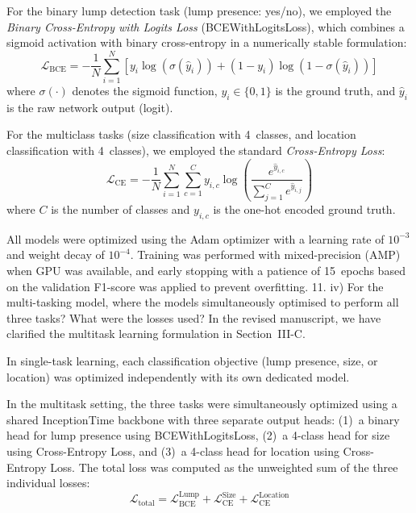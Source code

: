 \documentclass[a4paper, onecolumn]{IEEEtran}
\newcommand\blue[1]{{\textcolor{white!30!blue}{#1}}}
\begin{document}
For the binary lump detection task (lump presence: yes/no), we employed the \textit{Binary Cross-Entropy with Logits Loss} (BCEWithLogitsLoss), which combines a sigmoid activation with binary cross-entropy in a numerically stable formulation:
\begin{equation}
    \mathcal{L}_{\text{BCE}} = -\frac{1}{N}\sum_{i=1}^{N}\left[y_i \log(\sigma(\hat{y}_i)) + (1-y_i)\log(1-\sigma(\hat{y}_i))\right]
\end{equation}
where $\sigma(\cdot)$ denotes the sigmoid function, $y_i \in \{0,1\}$ is the ground truth, and $\hat{y}_i$ is the raw network output (logit).

For the multiclass tasks (size classification with 4~classes, and location classification with 4~classes), we employed the standard \textit{Cross-Entropy Loss}:
\begin{equation}
    \mathcal{L}_{\text{CE}} = -\frac{1}{N}\sum_{i=1}^{N}\sum_{c=1}^{C} y_{i,c} \log\left(\frac{e^{\hat{y}_{i,c}}}{\sum_{j=1}^{C}e^{\hat{y}_{i,j}}}\right)
\end{equation}
where $C$ is the number of classes and $y_{i,c}$ is the one-hot encoded ground truth.

All models were optimized using the Adam optimizer with a learning rate of $10^{-3}$ and weight decay of $10^{-4}$. Training was performed with mixed-precision (AMP) when GPU was available, and early stopping with a patience of 15~epochs based on the validation F1-score was applied to prevent overfitting.
\blue{11. iv) For the multi-tasking model, where the models simultaneously optimised to perform all three tasks? What were the losses used?}
In the revised manuscript, we have clarified the multitask learning formulation in Section~III-C.

In single-task learning, each classification objective (lump presence, size, or location) was optimized independently with its own dedicated model.

In the multitask setting, the three tasks were simultaneously optimized using a shared InceptionTime backbone with three separate output heads: (1)~a binary head for lump presence using BCEWithLogitsLoss, (2)~a 4-class head for size using Cross-Entropy Loss, and (3)~a 4-class head for location using Cross-Entropy Loss. The total loss was computed as the unweighted sum of the three individual losses:
\begin{equation}
    \mathcal{L}_{\text{total}} = \mathcal{L}_{\text{BCE}}^{\text{Lump}} + \mathcal{L}_{\text{CE}}^{\text{Size}} + \mathcal{L}_{\text{CE}}^{\text{Location}}
\end{equation}
\end{document}
